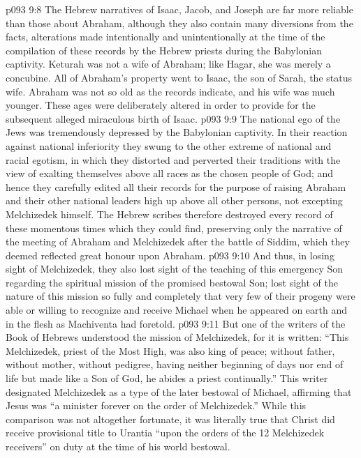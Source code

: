 \vs p093 9:8 The Hebrew narratives of Isaac, Jacob, and Joseph are far more reliable than those about Abraham, although they also contain many diversions from the facts, alterations made intentionally and unintentionally at the time of the compilation of these records by the Hebrew priests during the Babylonian captivity. Keturah was not a wife of Abraham; like Hagar, she was merely a concubine. All of Abraham’s property went to Isaac, the son of Sarah, the status wife. Abraham was not so old as the records indicate, and his wife was much younger. These ages were deliberately altered in order to provide for the subsequent alleged miraculous birth of Isaac.
\vs p093 9:9 \pc The national ego of the Jews was tremendously depressed by the Babylonian captivity. In their reaction against national inferiority they swung to the other extreme of national and racial egotism, in which they distorted and perverted their traditions with the view of exalting themselves above all races as the chosen people of God; and hence they carefully edited all their records for the purpose of raising Abraham and their other national leaders high up above all other persons, not excepting Melchizedek himself. The Hebrew scribes therefore destroyed every record of these momentous times which they could find, preserving only the narrative of the meeting of Abraham and Melchizedek after the battle of Siddim, which they deemed reflected great honour upon Abraham.
\vs p093 9:10 And thus, in losing sight of Melchizedek, they also lost sight of the teaching of this emergency Son regarding the spiritual mission of the promised bestowal Son; lost sight of the nature of this mission so fully and completely that very few of their progeny were able or willing to recognize and receive Michael when he appeared on earth and in the flesh as Machiventa had foretold.
\vs p093 9:11 But one of the writers of the Book of Hebrews understood the mission of Melchizedek, for it is written: “This Melchizedek, priest of the Most High, was also king of peace; without father, without mother, without pedigree, having neither beginning of days nor end of life but made like a Son of God, he abides a priest continually.” This writer designated Melchizedek as a type of the later bestowal of Michael, affirming that Jesus was “a minister forever on the order of Melchizedek.” While this comparison was not altogether fortunate, it was literally true that Christ did receive provisional title to Urantia “upon the orders of the 12 Melchizedek receivers” on duty at the time of his world bestowal.
